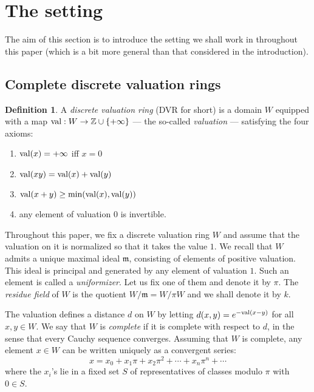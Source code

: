 \documentclass{jT}
\numberwithin{equation}{section}
\DeclareMathOperator{\val}{val}
\theoremstyle{definition}
\newtheorem{deftn}[theo]{Definition}
\newcommand{\Z}{\mathbb Z}
\newcommand{\m}{\mathfrak m}
\renewcommand{\min}{\text{\rm min}}
\renewcommand{\val}{\text{\rm val}}
\newcommand{\A}{W}
\begin{document}
\section{The setting}
\label{subsec:setting}

The aim of this section is to introduce the setting we shall work in 
throughout this paper (which is a bit more general than that considered 
in the introduction).

\subsection{Complete discrete valuation rings}

\begin{deftn}
A \emph{discrete valuation ring} (DVR for short) is a domain $\A$
equipped with a map $\val : \A \to \Z \cup \{+\infty\}$ --- the 
so-called \emph{valuation} --- satisfying the four axioms: 
\begin{enumerate}
\item $\val(x) = +\infty$ iff $x = 0$
\item $\val(xy) = \val(x) + \val(y)$
\item $\val(x+y) \geq \min(\val(x), \val(y))$
\item any element of valuation $0$ is invertible.
\end{enumerate}
\end{deftn}

Throughout this paper, we fix a discrete valuation ring $\A$ and assume 
that the valuation on it is normalized so that it takes the value $1$. 
We recall that $\A$ admits a unique maximal ideal $\m$, consisting of 
elements of positive valuation. This ideal is principal and 
generated by any element of valuation $1$. Such an element is called a 
\emph{uniformizer}. Let us fix one of them and denote it by $\pi$. The 
\emph{residue field} of $\A$ is the quotient $\A/\m = \A/\pi\A$ and we 
shall denote it by $k$.

The valuation defines a distance $d$ on $\A$ by letting $d(x,y) = 
e^{-\val(x-y)}$ for all $x, y \in \A$. We say that $\A$ is 
\emph{complete} if it is complete with respect to $d$, in the sense that 
every Cauchy sequence converges. Assuming that $\A$ is complete, any 
element $x \in \A$ can be written uniquely as a convergent series:
\begin{equation}
\label{eq:expandCDVR}
x = x_0 + x_1 \pi + x_2 \pi^2 + \cdots + x_n \pi^n + \cdots
\end{equation}
where the $x_i$'s lie in a fixed set $S$ of representatives of classes
modulo $\pi$ with $0 \in S$.
\end{document}
